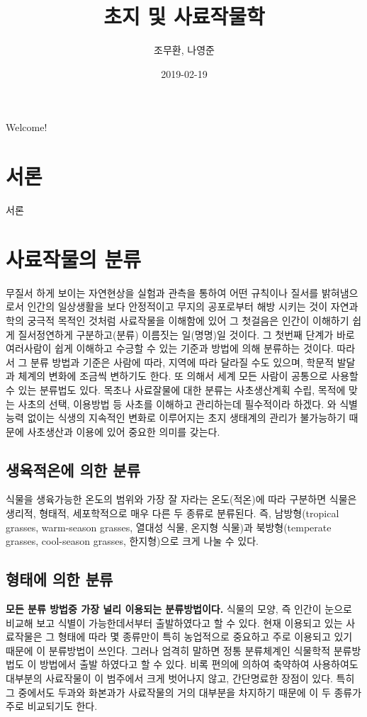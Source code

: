 \documentclass[]{book}
\title{초지 및 사료작물학}
\author{조무환, 나영준}
\date{2019-02-19}
\begin{document}
\maketitle

{
\setcounter{tocdepth}{1}
\tableofcontents
}
Welcome!

\chapter{서론}\label{intro}

서론

\chapter{사료작물의 분류}\label{classification}

무질서 하게 보이는 자연현상을 실험과 관측을 통하여 어떤 규칙이나 질서를
밝혀냄으로서 인간의 일상생활을 보다 안정적이고 무지의 공포로부터 해방
시키는 것이 자연과학의 궁극적 목적인 것처럼 사료작물을 이해함에 있어 그
첫걸음은 인간이 이해하기 쉽게 질서정연하게 구분하고(분류) 이름짓는
일(명명)일 것이다. 그 첫번째 단계가 바로 여러사람이 쉽게 이해하고 수긍할
수 있는 기준과 방법에 의해 분류하는 것이다. 따라서 그 분류 방법과 기준은
사람에 따라, 지역에 따라 달라질 수도 있으며, 학문적 발달과 체계의 변화에
조금씩 변하기도 한다. 또 의해서 세계 모든 사람이 공통으로 사용할 수 있는
분류법도 있다. 목초나 사료잘물에 대한 분류는 사초생산계획 수립, 목적에
맞는 사초의 선택, 이용방법 등 사초를 이해하고 관리하는데 필수적이라
하겠다. 와 식별능력 없이는 식생의 지속적인 변화로 이루어지는 초지
생태계의 관리가 불가능하기 때문에 사초생산과 이용에 있어 중요한 의미를
갖는다.

\section{생육적온에 의한 분류}\label{--}

식물을 생육가능한 온도의 범위와 가장 잘 자라는 온도(적온)에 따라
구분하면 식물은 생리적, 형태적, 세포학적으로 매우 다른 두 종류로
분류된다. 즉, 남방형(tropical grasses, warm-season grasses, 열대성 식물,
온지형 식물)과 북방형(temperate grasses, cool-season grasses,
한지형)으로 크게 나눌 수 있다.

\section{형태에 의한 분류}\label{--}

\textbf{모든 분류 방법중 가장 널리 이용되는 분류방법이다.} 식물의 모양,
즉 인간이 눈으로 비교해 보고 식별이 가능한데서부터 출발하였다고 할 수
있다. 현재 이용되고 있는 사료작물은 그 형태에 따라 몇 종류만이 특히
농업적으로 중요하고 주로 이용되고 있기 때문에 이 분류방법이 쓰인다.
그러나 엄격히 말하면 정통 분류체계인 식물학적 분류방법도 이 방법에서
출발 하였다고 할 수 있다. 비록 편의에 의하여 축약하여 사용하여도
대부분의 사료작물이 이 범주에서 크게 벗어나지 않고, 간단명료한 장점이
있다. 특히 그 중에서도 두과와 화본과가 사료작물의 거의 대부분을 차지하기
때문에 이 두 종류가 주로 비교되기도 한다.
\end{document}
